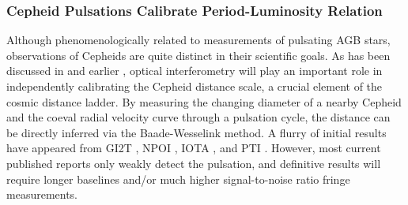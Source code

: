 \documentclass[12pt]{article}
\begin{document}
\subsubsection{Cepheid Pulsations Calibrate Period-Luminosity Relation}
Although phenomenologically related to measurements of pulsating AGB
stars, observations of Cepheids are quite distinct in their scientific
goals.  As has been discussed in \citet{sasselov1994} and earlier
\citep[e.g.,][]{davis1976}, optical interferometry will play an
important role in independently calibrating the Cepheid distance
scale, a crucial element of the cosmic distance ladder.  By measuring
the changing diameter of a nearby Cepheid and the coeval radial
velocity curve through a pulsation cycle, the distance can be directly
inferred via the Baade-Wesselink method.  A flurry of initial results
have appeared from GI2T \citep{mourard1997}, NPOI
\citep{armstrong2001}, IOTA \citep{kervella2001}, and PTI \citep[the
first definitive detection of Cepheid pulsation;][]{lane2000}.
However, most current published reports only weakly detect the
pulsation, and definitive results will require longer baselines and/or
much higher signal-to-noise ratio fringe measurements.
\end{document}

